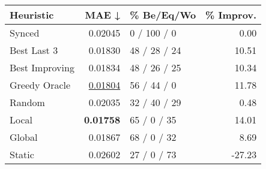 \begin{tabular}{lrlr}
\toprule
\textbf{Heuristic} & \textbf{MAE ↓} & \textbf{\% Be/Eq/Wo} & \textbf{\% Improv.} \\
\midrule
            Synced &        0.02045 &          0 / 100 / 0 &                0.00 \\
\midrule
       Best Last 3 &        0.01830 &         48 / 28 / 24 &               10.51 \\
    Best Improving &        0.01834 &         48 / 26 / 25 &               10.34 \\
\addlinespace
     Greedy Oracle &        \underline{0.01804} &          56 / 44 / 0 &               11.78 \\
            Random &        0.02035 &         32 / 40 / 29 &                0.48 \\
\midrule
             Local &        \textbf{0.01758} &          65 / 0 / 35 &               14.01 \\
            Global &        0.01867 &          68 / 0 / 32 &                8.69 \\
\midrule
            Static &        0.02602 &          27 / 0 / 73 &              -27.23 \\
\bottomrule
\end{tabular}

\label{tab:non_lr01_le2_bs2_Summary}
